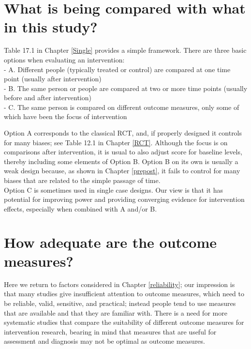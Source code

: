 \documentclass{krantz}
\begin{document}
\hypertarget{what-is-being-compared-with-what-in-this-study}{%
\section{What is being compared with what in this study?}\label{what-is-being-compared-with-what-in-this-study}}

Table 17.1 in Chapter \ref{Single} provides a simple framework. There are three basic options when evaluating an intervention:\\
- A. Different people (typically treated or control) are compared at one time point (usually after intervention)\\
- B. The same person or people are compared at two or more time points (usually before and after intervention)\\
- C. The same person is compared on different outcome measures, only some of which have been the focus of intervention

Option A corresponds to the classical RCT, and, if properly designed it controls for many biases; see Table 12.1 in Chapter \ref{RCT}. Although the focus is on comparisons after intervention, it is usual to also adjust score for baseline levels, thereby including some elements of Option B. Option B on its own is usually a weak design because, as shown in Chapter \ref{prepost}, it fails to control for many biases that are related to the simple passage of time.\\
Option C is sometimes used in single case designs. Our view is that it has potential for improving power and providing converging evidence for intervention effects, especially when combined with A and/or B.

\hypertarget{how-adequate-are-the-outcome-measures}{%
\section{How adequate are the outcome measures?}\label{how-adequate-are-the-outcome-measures}}

Here we return to factors considered in Chapter \ref{reliability}; our impression is that many studies give insufficient attention to outcome measures, which need to be reliable, valid, sensitive, and practical; instead people tend to use measures that are available and that they are familiar with. There is a need for more systematic studies that compare the suitability of different outcome measures for intervention research, bearing in mind that measures that are useful for assessment and diagnosis may not be optimal as outcome measures.
\end{document}
